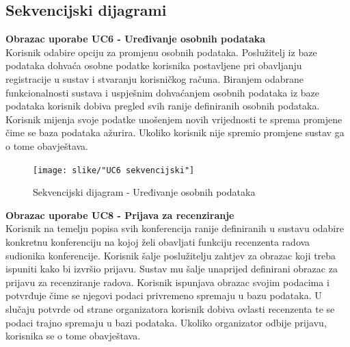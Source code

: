 			\text\newline\newline\newline\newline\newline\newline
				
			\subsection{Sekvencijski dijagrami}

				
				\noindent\textbf{Obrazac uporabe UC6 - Uređivanje osobnih podataka}\\
				
				\noindent Korisnik odabire opciju za promjenu osobnih podataka. Poslužitelj iz baze podataka dohvaća osobne podatke korisnika postavljene pri obavljanju registracije u sustav i stvaranju korisničkog računa. Biranjem odabrane funkcionalnosti sustava i uspješnim dohvaćanjem osobnih podataka iz baze podataka korisnik dobiva pregled svih ranije definiranih osobnih podataka. Korisnik mijenja svoje podatke unošenjem novih vrijednosti te sprema promjene čime se baza podataka ažurira. Ukoliko korisnik nije spremio promjene sustav ga o tome obavještava.
				
				\begin{figure}[H]
					\texttt{[image: slike/"UC6 sekvencijski"]} %
					\centering
					\caption{Sekvencijski dijagram - Uređivanje osobnih podataka}
					\label{UC6 sekvencijski} %
				\end{figure}
			
			
				\text\newline\newline\newline\newline\newline\newline\newline\newline\newline
			
				\noindent\textbf{Obrazac uporabe UC8 - Prijava za recenziranje}\\
				
				\noindent Korisnik na temelju popisa svih konferencija ranije definiranih u sustavu odabire konkretnu konferenciju na kojoj želi obavljati funkciju recenzenta radova sudionika konferencije. Korisnik šalje poslužitelju zahtjev za obrazac koji treba ispuniti kako bi izvršio prijavu. Sustav mu šalje unaprijed definirani obrazac za prijavu za recenziranje radova. Korisnik ispunjava obrazac svojim podacima i potvrđuje čime se njegovi podaci privremeno spremaju u bazu podataka. U slučaju potvrde od strane organizatora korisnik dobiva ovlasti recenzenta te se podaci trajno spremaju u bazi podataka. Ukoliko organizator odbije prijavu, korisnika se o tome obavještava.\newline\newline\newline\newline\newline
				
